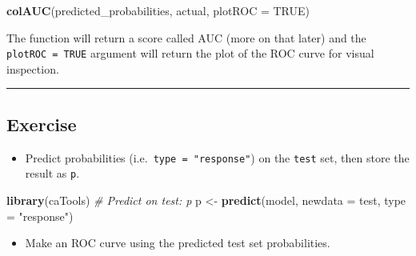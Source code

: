 \documentclass[
]{book}
\newenvironment{Shaded}{\begin{snugshade}}{\end{snugshade}}
\newcommand{\CommentTok}[1]{\textcolor[rgb]{0.56,0.35,0.01}{\textit{#1}}}
\newcommand{\DataTypeTok}[1]{\textcolor[rgb]{0.13,0.29,0.53}{#1}}
\newcommand{\KeywordTok}[1]{\textcolor[rgb]{0.13,0.29,0.53}{\textbf{#1}}}
\newcommand{\NormalTok}[1]{#1}
\newcommand{\OperatorTok}[1]{\textcolor[rgb]{0.81,0.36,0.00}{\textbf{#1}}}
\newcommand{\OtherTok}[1]{\textcolor[rgb]{0.56,0.35,0.01}{#1}}
\newcommand{\StringTok}[1]{\textcolor[rgb]{0.31,0.60,0.02}{#1}}
\providecommand{\tightlist}{%
  \setlength{\itemsep}{0pt}\setlength{\parskip}{0pt}}
\begin{document}
\begin{Shaded}
\begin{Highlighting}[]
\KeywordTok{colAUC}\NormalTok{(predicted_probabilities, actual, }\DataTypeTok{plotROC =} \OtherTok{TRUE}\NormalTok{)}
\end{Highlighting}
\end{Shaded}

The function will return a score called AUC (more on that later) and the \texttt{plotROC\ =\ TRUE} argument will return the plot of the ROC curve for visual inspection.

\begin{center}\rule{0.5\linewidth}{0.5pt}\end{center}

\hypertarget{exercise-14}{%
\subsection*{Exercise}\label{exercise-14}}

\begin{itemize}
\tightlist
\item
  Predict probabilities (i.e.~\texttt{type\ =\ "response"}) on the \texttt{test} set, then store the result as \texttt{p}.
\end{itemize}

\begin{Shaded}
\begin{Highlighting}[]
\KeywordTok{library}\NormalTok{(caTools)}
\CommentTok{# Predict on test: p}
\NormalTok{p <-}\StringTok{ }\KeywordTok{predict}\NormalTok{(model, }\DataTypeTok{newdata =}\NormalTok{ test, }\DataTypeTok{type =} \StringTok{"response"}\NormalTok{)}
\end{Highlighting}
\end{Shaded}

\begin{itemize}
\tightlist
\item
  Make an ROC curve using the predicted test set probabilities.
\end{itemize}

\begin{Shaded}
\end{Shaded}
\end{document}
